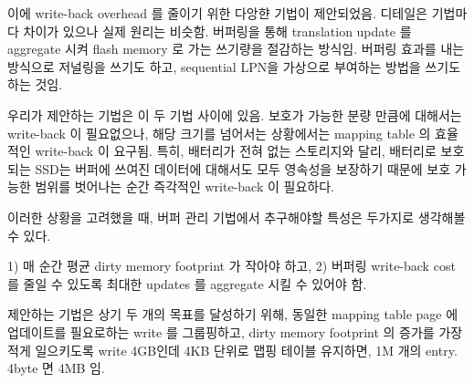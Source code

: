 \iffalse
SHRD (FAST ‘17): 호스트에서 저링 하는 것과 비슷. 임시로 sequential LPN 할당 (저널 주소로 생각하면 됨) 하고 데이터를 특정 영역 (임시 Sequential LPN 이 나타낼 수 있는 최대 영역)에 씀. 이게 넘어가면 임시 LPN을 원래의 LPN으로 업데이트. 이 때 원래의 LPN을 sorting 해서 업데이트. (user request 에 write buffer 쓰지 않음.) ⇒ 어떻게 보면 우리 것과 비슷.  
\fi

\iffalse
이에 write-back overhead 를 줄이기 위한 다앙햔 기법이 제안되었음. 디테일은 기법마다 차이가 있으나 실제 원리는 비슷함. 버퍼링을 통해 translation update 를 aggregate 시켜 flash memory 로 가는 쓰기량을 절감하는 방식임. 버퍼링 효과를 내는 방식으로 저널링을 쓰기도 하고, sequential LPN을 가상으로 부여하는 방법을 쓰기도 하는 것임. 

우리가 제안하는 기법은 이 두 기법 사이에 있음. 보호가 가능한 분량 만큼에 대해서는 write-back 이 필요없으나, 해당 크기를 넘어서는 상황에서는 mapping table 의 효율적인 write-back 이 요구됨. 특히, 배터리가 전혀 없는  스토리지와 달리, 배터리로 보호되는 SSD는 버퍼에 쓰여진 데이터에 대해서도 모두 영속성을 보장하기 때문에 보호 가능한 범위를 벗어나는 순간 즉각적인 write-back 이 필요하다. 

이러한 상황을 고려했을 때, 버퍼 관리 기법에서 추구해야할 특성은 두가지로 생각해볼 수 있다. 

1) 매 순간 평균 dirty memory footprint 가 작아야 하고,  
2) 버퍼링 write-back cost 를 줄일 수 있도록 최대한 updates 를 aggregate 시킬 수 있어야 함. 


제안하는 기법은 상기 두 개의 목표를 달성하기 위해, 동일한 mapping table page 에 업데이트를 필요로하는 write 를 그룹핑하고, dirty memory footprint 의 증가를 가장 적게 일으키도록 write 
4GB인데 4KB 단위로 맵핑 테이블 유지하면, 1M 개의 entry. 4byte 면 4MB 임. 




